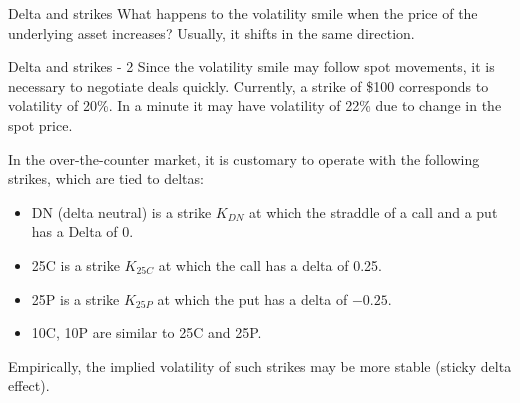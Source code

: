 \documentclass{beamer}
\begin{document}
\begin{frame}{Delta and strikes}
\justify
What happens to the volatility smile when the price of the underlying asset increases? Usually, it shifts in the same direction.

\centering
{}
\end{frame}



\begin{frame}{Delta and strikes - 2}
\justify
Since the volatility smile may follow spot movements, it is necessary to negotiate deals quickly. Currently, a strike of \$100 corresponds to volatility of 20\%. In a minute it may have volatility of 22\% due to change in the spot price.

\justify
In the over-the-counter market, it is customary to operate with the following strikes, which are tied to deltas:
\begin{itemize}
\item DN (delta neutral) is a strike $K_{DN}$ at which the straddle of a call and a put has a Delta of 0.
\item 25C is a strike $K_{25C}$ at which the call has a delta of 0.25.
\item 25P is a strike $K_{25P}$ at which the put has a delta of $-0.25$.
\item 10C, 10P are similar to 25C and 25P.
\end{itemize}

\justify
Empirically, the implied volatility of such strikes may be more stable (sticky delta effect).
\end{frame}
\end{document}
